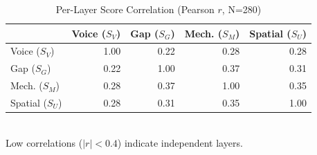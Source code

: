 \begin{table}[h]
\centering
\caption{Per-Layer Score Correlation (Pearson $r$, N=280)}
\label{tab:correlation}
\scriptsize
\begin{tabular}{lrrrr}
\toprule
& \textbf{Voice ($S_V$)} & \textbf{Gap ($S_G$)} & \textbf{Mech. ($S_M$)} & \textbf{Spatial ($S_U$)} \\
\midrule
Voice ($S_V$) & 1.00 & 0.22 & 0.28 & 0.28 \\
Gap ($S_G$) & 0.22 & 1.00 & 0.37 & 0.31 \\
Mech. ($S_M$) & 0.28 & 0.37 & 1.00 & 0.35 \\
Spatial ($S_U$) & 0.28 & 0.31 & 0.35 & 1.00 \\
\bottomrule
\end{tabular}
\\[2pt]
\scriptsize Low correlations ($|r| < 0.4$) indicate independent layers.
\end{table}
